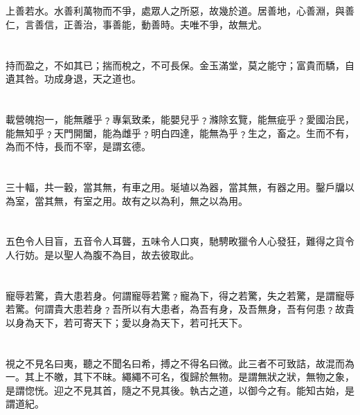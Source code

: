 \documentclass[11pt,oneside]{article}
\begin{document}
\section{}
\label{sec:orgheadline8}
上善若水。水善利萬物而不爭，處眾人之所惡，故幾於道。居善地，心善淵，與善仁，言善信，正善治，事善能，動善時。夫唯不爭，故無尤。

\section{}
\label{sec:orgheadline9}
持而盈之，不如其已；揣而梲之，不可長保。金玉滿堂，莫之能守；富貴而驕，自遺其咎。功成身退，天之道也。

\section{}
\label{sec:orgheadline10}
載營魄抱一，能無離乎﹖專氣致柔，能嬰兒乎﹖滌除玄覽，能無疵乎﹖愛國治民，能無知乎﹖天門開闔，能為雌乎﹖明白四達，能無為乎﹖生之，畜之。生而不有，為而不恃，長而不宰，是謂玄德。

\section{}
\label{sec:orgheadline11}
三十輻，共一轂，當其無，有車之用。埏埴以為器，當其無，有器之用。鑿戶牖以為室，當其無，有室之用。故有之以為利，無之以為用。

\section{}
\label{sec:orgheadline12}
五色令人目盲，五音令人耳聾，五味令人口爽，馳騁畋獵令人心發狂，難得之貨令人行妨。是以聖人為腹不為目，故去彼取此。


\section{}
\label{sec:orgheadline13}
寵辱若驚，貴大患若身。何謂寵辱若驚﹖寵為下，得之若驚，失之若驚，是謂寵辱若驚。何謂貴大患若身﹖吾所以有大患者，為吾有身，及吾無身，吾有何患﹖故貴以身為天下，若可寄天下；愛以身為天下，若可托天下。

\section{}
\label{sec:orgheadline14}
視之不見名曰夷，聽之不聞名曰希，搏之不得名曰微。此三者不可致詰，故混而為一。其上不皦，其下不昧。繩繩不可名，復歸於無物。是謂無狀之狀，無物之象，是謂惚恍。迎之不見其首，隨之不見其後。執古之道，以御今之有。能知古始，是謂道紀。
\end{document}
